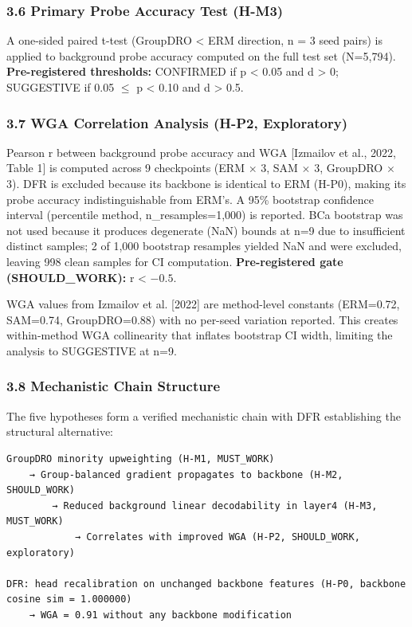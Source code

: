 \subsubsection{3.6 Primary Probe Accuracy Test (H-M3)}

A one-sided paired t-test (GroupDRO < ERM direction, n = 3 seed pairs) is applied to background probe accuracy computed on the full test set (N=5,794). \textbf{Pre-registered thresholds:} CONFIRMED if p < 0.05 and d > 0; SUGGESTIVE if 0.05 $\leq$ p < 0.10 and d > 0.5.

\subsubsection{3.7 WGA Correlation Analysis (H-P2, Exploratory)}

Pearson r between background probe accuracy and WGA [Izmailov et al., 2022, Table 1] is computed across 9 checkpoints (ERM $\times$ 3, SAM $\times$ 3, GroupDRO $\times$ 3). DFR is excluded because its backbone is identical to ERM (H-P0), making its probe accuracy indistinguishable from ERM's. A 95\% bootstrap confidence interval (percentile method, n\_resamples=1,000) is reported. BCa bootstrap was not used because it produces degenerate (NaN) bounds at n=9 due to insufficient distinct samples; 2 of 1,000 bootstrap resamples yielded NaN and were excluded, leaving 998 clean samples for CI computation. \textbf{Pre-registered gate (SHOULD\_WORK):} r < $-0.5$.

WGA values from Izmailov et al. [2022] are method-level constants (ERM=0.72, SAM=0.74, GroupDRO=0.88) with no per-seed variation reported. This creates within-method WGA collinearity that inflates bootstrap CI width, limiting the analysis to SUGGESTIVE at n=9.

\subsubsection{3.8 Mechanistic Chain Structure}

The five hypotheses form a verified mechanistic chain with DFR establishing the structural alternative:

\begin{verbatim}
GroupDRO minority upweighting (H-M1, MUST_WORK)
    → Group-balanced gradient propagates to backbone (H-M2, SHOULD_WORK)
        → Reduced background linear decodability in layer4 (H-M3, MUST_WORK)
            → Correlates with improved WGA (H-P2, SHOULD_WORK, exploratory)

DFR: head recalibration on unchanged backbone features (H-P0, backbone cosine sim = 1.000000)
    → WGA = 0.91 without any backbone modification
\end{verbatim}

